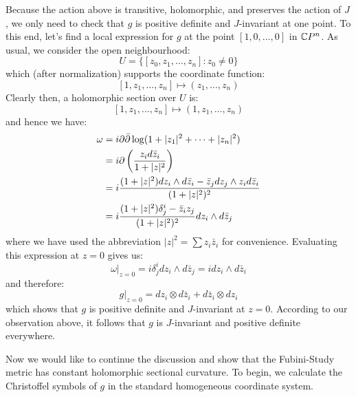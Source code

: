 Because the action above is transitive, holomorphic, and preserves the action of $J$, we only need to check that $g$ is positive definite and $J$-invariant at one point.  To this end, let's find a local expression for $g$ at the point $[1,0, \ldots, 0]$ in $\mathbb{C}P^n$.  As usual, we consider the open neighbourhood:
%
$$U = \{ [z_0,z_1, \ldots, z_n]: z_0 \neq 0 \} $$
%
which (after normalization) supports the coordinate function:
%
$$[1,z_1, \ldots, z_n] \mapsto (z_1, \ldots, z_n)$$
%
Clearly then, a holomorphic section over $U$ is:
%
$$[1,z_1, \ldots, z_n] \mapsto (1,z_1, \ldots, z_n)$$
%
and hence we have:
%
\begin{align*}
\omega &= i \partial \bar{\partial} \log( 1 + |z_1|^2 + \cdots + |z_n|^2 ) \\
&= i \partial \left( \frac{ z_i d\bar{z}_i }{ 1 + |z|^2 } \right) \\
&= i \frac{ (1 + |z|^2 ) dz_i \wedge d \bar{z}_i - \bar{z}_j d z_j \wedge z_i d \bar{z}_i }{ (1 + |z|^2 )^2 } \\
&= i \frac{ (1 + |z|^2)\delta^i_j - \bar{z}_i z_j }{ (1 + |z|^2)^2 } d z_i \wedge d \bar{z}_j
\end{align*}
%
where we have used the abbreviation $|z|^2 = \sum z_i \bar{z}_i$ for convenience.  Evaluating this expression at $z=0$ gives us:
%
$$ \omega|_{z=0} = i \delta^i_j dz_i \wedge d \bar{z}_j = i dz_i \wedge d \bar{z}_i $$
%
and therefore:
%
$$ g|_{z=0} = dz_i \otimes d \bar{z}_i + d \bar{z}_i \otimes d z_i $$
%
which shows that $g$ is positive definite and $J$-invariant at $z=0$.  According to our observation above, it follows that $g$ is $J$-invariant and positive definite everywhere.

Now we would like to continue the discussion and show that the Fubini-Study metric has constant holomorphic sectional curvature.  To begin, we calculate the Christoffel symbols of $g$ in the standard homogeneous coordinate system.  

